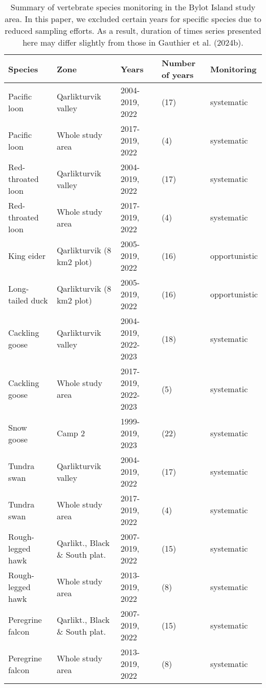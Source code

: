 \begin{table}[ht]
\centering
\caption{Summary of vertebrate species monitoring in the Bylot Island study area. In this paper, we excluded certain years for specific species due to reduced sampling efforts. As a result, duration of times series presented here may differ slightly from those in Gauthier et al. (2024b).} 
\label{table:table_species_year_monitoring}
\begingroup\fontsize{8pt}{10pt}\selectfont
\begin{tabularx}{\textwidth}{lllll}
  \hline
{\textbf{Species}} & {\textbf{Zone}} & {\textbf{Years}} & {\textbf{Number of years}} & {\textbf{Monitoring}} \\ 
  \hline
Pacific loon & Qarlikturvik valley & 2004-2019, 2022 & (17) & systematic \\ 
  Pacific loon & Whole study area & 2017-2019, 2022 & (4) & systematic \\ 
  Red-throated loon & Qarlikturvik valley & 2004-2019, 2022 & (17) & systematic \\ 
  Red-throated loon & Whole study area & 2017-2019, 2022 & (4) & systematic \\ 
  King eider & Qarlikturvik (8 km2 plot) & 2005-2019, 2022 & (16) & opportunistic \\ 
  Long-tailed duck & Qarlikturvik (8 km2 plot) & 2005-2019, 2022 & (16) & opportunistic \\ 
  Cackling goose & Qarlikturvik valley & 2004-2019, 2022-2023 & (18) & systematic \\ 
  Cackling goose & Whole study area & 2017-2019, 2022-2023 & (5) & systematic \\ 
  Snow goose & Camp 2 & 1999-2019, 2023 & (22) & systematic \\ 
  Tundra swan & Qarlikturvik valley & 2004-2019, 2022 & (17) & systematic \\ 
  Tundra swan & Whole study area & 2017-2019, 2022 & (4) & systematic \\ 
  Rough-legged hawk & Qarlikt., Black \& South plat. & 2007-2019, 2022 & (15) & systematic \\ 
  Rough-legged hawk & Whole study area & 2013-2019, 2022 & (8) & systematic \\ 
  Peregrine falcon & Qarlikt., Black \& South plat. & 2007-2019, 2022 & (15) & systematic \\ 
  Peregrine falcon & Whole study area & 2013-2019, 2022  & (8) & systematic \\ 

\end{tabularx}
\end{table}
